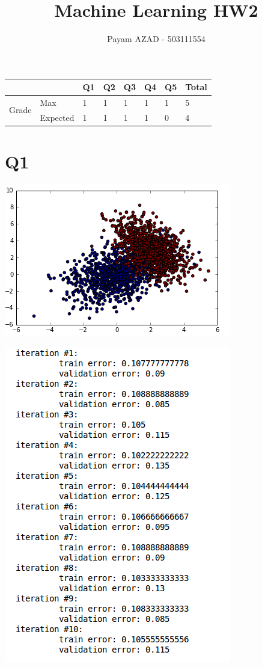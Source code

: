 \documentclass[11]{article}
\title{Machine Learning HW2}
\author{Payam AZAD - 503111554}
\begin{document}
 \maketitle
 
 \begin{table}[ht!]
\centering
\label{my-label}
\begin{tabular}{|ll|l|l|l|l|l|l|}
\hline
                                             &          & Q1 & Q2 & Q3 & Q4 & Q5 & Total \\ \hline
\multicolumn{1}{|l|}{\multirow{2}{*}{Grade}} & Max      & 1  & 1  & 1  & 1  & 1  & 5     \\ \cline{2-8} 
\multicolumn{1}{|l|}{}                       & Expected & 1  & 1  & 1  & 1  & 0  & 4     \\ \hline
\end{tabular}
\end{table}


 \section*{Q1}
 
 \includegraphics[scale=1]{fig1.png}
 
 \includegraphics[scale=1]{fig2.png}
 
\end{document}
